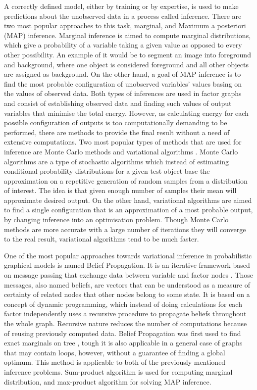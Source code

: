 A correctly defined model, either by training or by expertise, is used to make predictions about the unobserved data in a process called inference. There are two most popular approaches to this task, marginal, and Maximum a posteriori (MAP) inference. Marginal inference is aimed to compute marginal distributions, which give a probability of a variable taking a given value as opposed to every other possibility. An example of it would be to segment an image into foreground and background, where one object is considered foreground and all other objects are assigned as background. On the other hand, a goal of MAP inference is to find the most probable configuration of unobserved variables’ values basing on the values of observed data. Both types of inferences are used in factor graphs and consist of establishing observed data and finding such values of output variables that minimise the total energy. However, as calculating energy for each possible configuration of outputs is too computationally demanding to be performed, there are methods to provide the final result without a need of extensive computations. Two most popular types of methods that are used for inference are Monte Carlo methods and variational algorithms \cite{crf_sutton}. Monte Carlo algorithms are a type of stochastic algorithms which instead of estimating conditional probability distributions for a given test object base the approximation on a repetitive generation of random samples from a distribution of interest. The idea is that given enough number of samples their mean will approximate desired output. On the other hand, variational algorithms are aimed to find a single configuration that is an approximation of a most probable output, by changing inference into an optimisation problem. Though Monte Carlo methods are more accurate with a large number of iterations they will converge to the real result, variational algorithms tend to be much faster. 

One of the most popular approaches towards variational inference in probabilistic graphical models is named Belief Propagation. It is an iterative framework based on message passing that exchange data between variable and factor nodes \cite{markov_blake}. Those messages, also named beliefs, are vectors that can be understood as a measure of certainty of related nodes that other nodes belong to some state. It is based on a concept of dynamic programming, which instead of doing calculations for each factor independently uses a recursive procedure to propagate beliefs throughout the whole graph. Recursive nature reduces the number of computations because of reusing previously computed data. Belief Propagation was first used to find exact marginals on tree \cite{bayes_pearl}, tough it is also applicable in a general case of graphs that may contain loops, however, without a guarantee of finding a  global optimum. This method is applicable to both of the previously mentioned inference problems. Sum-product algorithm is used for computing marginal distribution, and max-product algorithm for solving MAP inference. 

